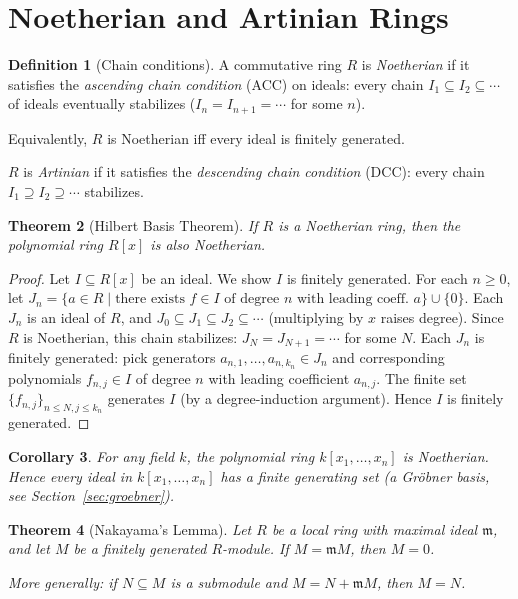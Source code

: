 \documentclass[12pt,a4paper]{amsart}
\newtheorem{theorem}{Theorem}[section]
\newtheorem{corollary}[theorem]{Corollary}
\theoremstyle{definition}
\newtheorem{definition}[theorem]{Definition}
\theoremstyle{definition}
\begin{document}
\section{Noetherian and Artinian Rings}

\begin{definition}[Chain conditions]
A commutative ring $R$ is \emph{Noetherian} if it satisfies the \emph{ascending
chain condition} (ACC) on ideals: every chain $I_1 \subseteq I_2 \subseteq \cdots$
of ideals eventually stabilizes ($I_n = I_{n+1} = \cdots$ for some $n$).

Equivalently, $R$ is Noetherian iff every ideal is finitely generated.

$R$ is \emph{Artinian} if it satisfies the \emph{descending chain condition} (DCC):
every chain $I_1 \supseteq I_2 \supseteq \cdots$ stabilizes.
\end{definition}

\begin{theorem}[Hilbert Basis Theorem]\label{thm:hilbert-basis}
If $R$ is a Noetherian ring, then the polynomial ring $R[x]$ is also Noetherian.
\end{theorem}

\begin{proof}
Let $I \subseteq R[x]$ be an ideal. We show $I$ is finitely generated.
For each $n \geq 0$, let $J_n = \{a \in R \mid \text{there exists } f \in I
\text{ of degree } n \text{ with leading coeff.\ } a\} \cup \{0\}$.
Each $J_n$ is an ideal of $R$, and $J_0 \subseteq J_1 \subseteq J_2 \subseteq \cdots$
(multiplying by $x$ raises degree). Since $R$ is Noetherian, this chain stabilizes:
$J_N = J_{N+1} = \cdots$ for some $N$. Each $J_n$ is finitely generated: pick
generators $a_{n,1},\ldots,a_{n,k_n} \in J_n$ and corresponding polynomials
$f_{n,j} \in I$ of degree $n$ with leading coefficient $a_{n,j}$.
The finite set $\{f_{n,j}\}_{n \leq N, j \leq k_n}$ generates $I$ (by a
degree-induction argument). Hence $I$ is finitely generated.
\end{proof}

\begin{corollary}
For any field $k$, the polynomial ring $k[x_1,\ldots,x_n]$ is Noetherian.
Hence every ideal in $k[x_1,\ldots,x_n]$ has a finite generating set (a
\emph{Gröbner basis}, see Section~\ref{sec:groebner}).
\end{corollary}

\begin{theorem}[Nakayama's Lemma]\label{thm:nakayama}
Let $R$ be a local ring with maximal ideal $\mathfrak{m}$, and let $M$ be a
finitely generated $R$-module. If $M = \mathfrak{m}M$, then $M = 0$.

More generally: if $N \subseteq M$ is a submodule and $M = N + \mathfrak{m}M$,
then $M = N$.
\end{theorem}
\end{document}
